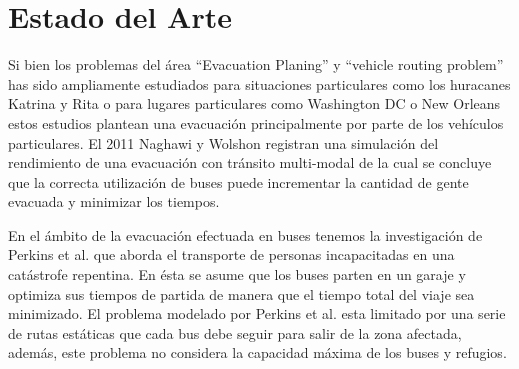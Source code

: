\documentclass[letter, 10pt]{article}
\begin{document}
\section{Estado del Arte}\label{sec:art}

    Si bien los problemas del área ``Evacuation Planing'' y ``vehicle routing
    problem'' has sido ampliamente estudiados para situaciones particulares 
    como los huracanes Katrina y
    Rita\cite{kiefer2006incrementalism}\cite{litman2006lessons} o para lugares
    particulares como Washington DC\cite{liu2008corridor} o New 
    Orleans\cite{wolshon2002planning} estos estudios plantean una evacuación
    principalmente por parte de los vehículos particulares. El 2011 Naghawi y
    Wolshon\cite{naghawi2011performance}\cite{naghawi2011operation} registran 
    una simulación del rendimiento de una evacuación con tránsito multi-modal
    de la cual se concluye que la correcta utilización de buses puede
    incrementar la cantidad de gente evacuada y minimizar los tiempos. 

    En el ámbito de la evacuación efectuada en buses tenemos la investigación
    de Perkins et al.\cite{perkins2001modeling} que aborda el transporte de
    personas incapacitadas en una catástrofe repentina. En ésta se asume que los
    buses parten en un garaje y optimiza sus tiempos de partida de manera que el
    tiempo total del viaje sea minimizado. El problema modelado por Perkins et
    al. esta limitado por una serie de rutas estáticas que cada bus debe seguir
    para salir de la zona afectada, además, este problema no considera la
    capacidad máxima de los buses y refugios.
\end{document}
